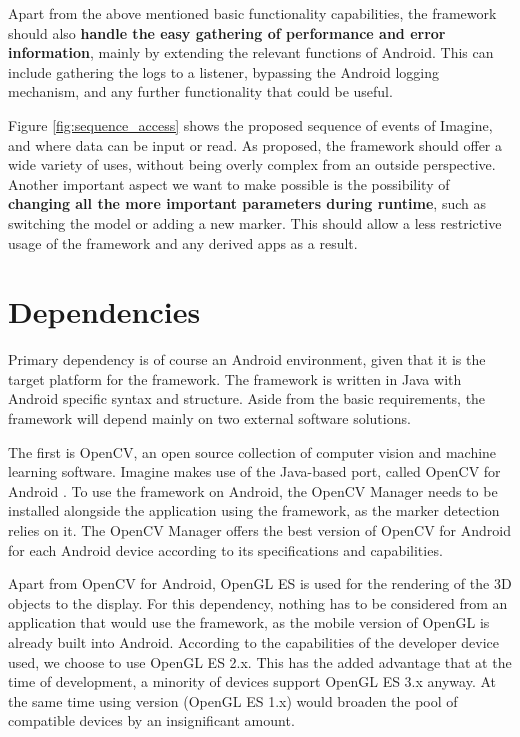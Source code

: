 Apart from the above mentioned basic functionality capabilities, the framework should also \textbf{handle the easy gathering of performance and error information}, mainly by extending the relevant functions of Android.
This can include gathering the logs to a listener, bypassing the Android logging mechanism, and any further functionality that could be useful.

Figure \ref{fig:sequence_access} shows the proposed sequence of events of Imagine, and where data can be input or read.
As proposed, the framework should offer a wide variety of uses, without being overly complex from an outside perspective.
Another important aspect we want to make possible is the possibility of \textbf{changing all the more important parameters during runtime}, such as switching the model or adding a new marker.
This should allow a less restrictive usage of the framework and any derived apps as a result.

\section{Dependencies}

Primary dependency is of course an Android environment, given that it is the target platform for the framework.
The framework is written in Java with Android specific syntax and structure.
Aside from the basic requirements, the framework will depend mainly on two external software solutions.

The first is OpenCV, an open source collection of computer vision and machine learning software.
Imagine makes use of the Java-based port, called OpenCV for Android \cite{opencvandroid}.
To use the framework on Android, the OpenCV Manager\cite{opencvmanager} needs to be installed alongside the application using the framework, as the marker detection relies on it.
The OpenCV Manager offers the best version of OpenCV for Android for each Android device according to its specifications and capabilities.

Apart from OpenCV for Android, OpenGL ES is used for the rendering of the 3D objects to the display.
For this dependency, nothing has to be considered from an application that would use the framework, as the mobile version of OpenGL is already built into Android.
According to the capabilities of the developer device used, we choose to use OpenGL ES 2.x.
This has the added advantage that at the time of development, a minority of devices support OpenGL ES 3.x anyway.
At the same time using version (OpenGL ES 1.x) would broaden the pool of compatible devices by an insignificant amount.

